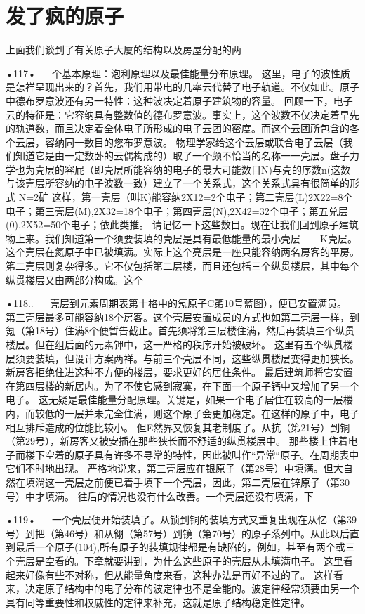 \section{发了疯的原子}

上面我们谈到了有关原子大厦的结构以及房屋分配的两

•117•
  
个基本原理：泡利原理以及最佳能量分布原理。
这里，电子的波性质是怎祥呈现出来的？首先，我们用带电的几率云代替了电子轨道。不仅如此。原子中德布罗意波还有另一特性：这种波决定着原子建筑物的容量。
回顾一下，电子云的特征是：它容纳具有整数值的德布罗意波。事实上，这个波数不仅决定着早先的轨道数，而且决定着全体电子所形成的电子云团的密度。而这个云团所包含的各个云层，容纳同一数目的您布罗意波。
物理学家给这个云层或联合电子云层（我们知道它是由一定数卧的云偶构成的）取了一个颇不恰当的名称一一壳层。盘子力学也为壳层的容屁（即壳层所能容纳的电子的最大可能数目N)与壳的序数n(这数与该壳层所容纳的电子波数一致）建立了一个关系式，这个关系式具有很简单的形式
N=2矿
这样，第一壳层（叫K)能容纳2X12=2个电子；第二壳层(L)2X22=8个电子；第三壳层(M),2X32=18个电子；第四壳层(N),2X42=32个电子；第五兑层(0),2X52=50个电子；依此类推。
请记忆一下这些数目。现在让我们回到原子建筑物上来。我们知道第一个须要装填的壳层是具有最低能量的最小壳层——K壳层。这个壳层在氮原子中已被填满。实际上这个亮层是一座只能容纳两名房客的平房。
笫二壳层则复杂得多。它不仅包括第二层楼，而且还包栝三个纵贯楼层，其中每个纵贯楼层又由两部分构成。这个

•118..
  
壳层到元素周期表第十格中的氖原子C笫10号蓝图），便已安置满员。
第三壳层最多可能容纳18个房客。这个壳层安置成员的方式也如第二壳层一样，到氪（第18号）住满8个便暂告截止。首先须将笫三层楼住满，然后再装填三个纵贯楼层。但在组后面的元素钾中，这一严格的秩序开始被破坏。
这里有五个纵贯楼层须要装填，但设计方案两祥。与前三个壳层不同，这些纵贯楼层变得更加狭长。新房客拒绝住进这种不方便的楼层，要求更好的居住条件。
最后建筑师将它安置在第四层楼的新居内。为了不使它感到寂寞，在下面一个原子钙中又增加了另一个电子。
这无疑是最佳能量分配原理。关键是，如果一个电子居住在较高的一层楼内，而较低的一层并未完全住满，则这个原子会更加稳定。在这样的原子中，电子相互排斥造成的位能比较小。
但E然界又恢复其老制度了。从抗（笫21号）到铜（第29号），新房客又被安插在那些狭长而不舒适的纵贯楼层中。
那些楼上住着电子而楼下空着的原子具有许多不寻常的特性，因此被叫作“异常“原子。在周期表中它们不时地出现。
严格地说来，第三壳层应在银原子（第28号）中填满。但大自然在填淌这一壳层之前便已着手填下一个壳层，因此，第二壳层在锌原子（第30号）中才填满。
往后的情况也没有什么改善。一个壳层还没有填满，下

•119•
  
一个壳层便开始装填了。从锁到铜的装填方式又重复出现在从忆（第39号）到把（第46号）和从翎（第57号）到镜（第70号）的原子系列中。从此以后直到最后一个原子(104),所有原子的装填规律都是有缺陷的，例如，甚至有两个或三个壳层是空看的。下章就要讲到，为什么这些原子的壳层从未填满电子。
这里看起来好像有些不对称，但从能量角度来看，这种办法是再好不过的了。
这样看来，决定原子结构中的电子分布的波定律也不是全能的。波定律经常须要由另一个具有同等重要性和权威性的定律来补充，这就是原子结构稳定性定律。

